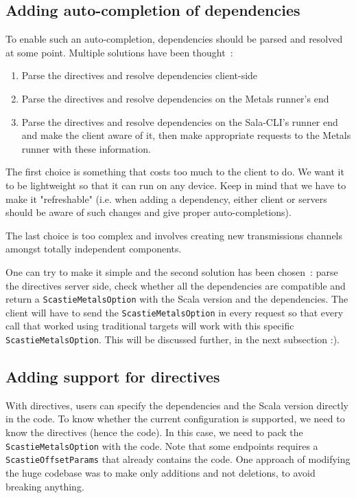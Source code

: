 \documentclass{article}
\begin{document}
\subsection{Adding auto-completion of dependencies}

To enable such an auto-completion, dependencies should be parsed and resolved at some point. Multiple solutions have been thought~:

\begin{enumerate}
    \item Parse the directives and resolve dependencies client-side
    \item Parse the directives and resolve dependencies on the Metals runner's end
    \item Parse the directives and resolve dependencies on the Sala-CLI's runner end and make the client aware of it, then make appropriate requests to the Metals runner with these information.
\end{enumerate}

The first choice is something that costs too much to the client to do. We want it to be lightweight so that it can run on any device. Keep in mind that we have to make it "refreshable" (i.e. when adding a dependency, either client or servers should be aware of such changes and give proper auto-completions).

The last choice is too complex and involves creating new transmissions channels amongst totally independent components.

One can try to make it simple and the second solution has been chosen~: parse the directives server side, check whether all the dependencies are compatible and return a \lstinline{ScastieMetalsOption} with the Scala version and the dependencies. The client will have to send the \lstinline{ScastieMetalsOption} in every request so that every call that worked using traditional targets will work with this specific \lstinline{ScastieMetalsOption}. This will be discussed further, in the next subsection :).


\subsection{Adding support for directives}

With directives, users can specify the dependencies and the Scala version directly in the code. To know whether the current configuration is supported, we need to know the directives (hence the code). In this case, we need to pack the \lstinline{ScastieMetalsOption} with the code. Note that some endpoints requires a \lstinline{ScastieOffsetParams} that already contains the code. One approach of modifying the huge codebase was to make only additions and not deletions, to avoid breaking anything.
\end{document}
